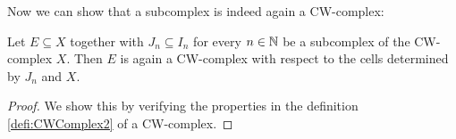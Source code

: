 Now we can show that a subcomplex is indeed again a CW-complex: 

\begin{lem}
    Let $E \subseteq X$ together with $J_n \subseteq I_n$ for every $n \in \mathbb{N}$ be a subcomplex of the CW-complex $X$. 
    Then $E$ is again a CW-complex with respect to the cells determined by $J_n$ and $X$.
\end{lem}
\begin{proof}
    We show this by verifying the properties in the definition \ref{defi:CWComplex2} of a CW-complex. 
    
\end{proof}